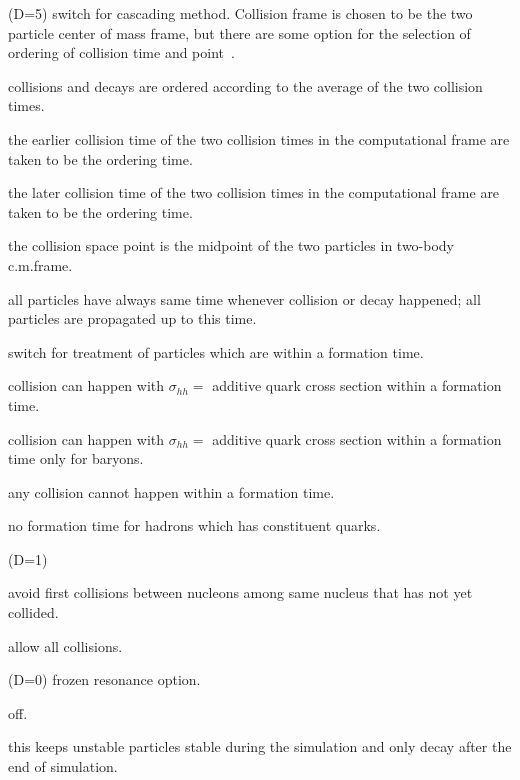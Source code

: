 \documentclass[]{article}
\newenvironment{entry}%
{\begin{list}{}{\setlength{\topsep}{0mm} \setlength{\itemsep}{0mm}
\setlength{\parskip}{0mm} \setlength{\parsep}{0mm}
\setlength{\leftmargin}{20mm} \setlength{\rightmargin}{0mm}
\setlength{\labelwidth}{18mm} \setlength{\labelsep}{2mm}}}%
{\end{list}}
\newenvironment{subentry}%
{\begin{list}{}{\setlength{\topsep}{0mm} \setlength{\itemsep}{0mm}
\setlength{\parskip}{0mm} \setlength{\parsep}{0mm}
\setlength{\leftmargin}{10mm} \setlength{\rightmargin}{0mm}
\setlength{\labelwidth}{18mm} \setlength{\labelsep}{2mm}}}%
{\end{list}}
\newcommand{\itemt}[1]{\item[{\tt #1}\hfill]}
\begin{document}
\begin{entry}
\itemt{mstc(52) :} (D=5) switch for cascading method. %
    Collision frame is chosen to be the two particle center of mass frame,
    but there are some option for the selection of ordering
    of collision time and point~\cite{zpc,bin1}.
 \begin{subentry}
    \itemt{$=2$:} collisions and decays are ordered according to the
                  average of the two collision times.
    \itemt{$=3$:} the earlier collision time of the two collision times
                  in the computational frame are taken to be the ordering time.
    \itemt{$=4$:} the later collision time of the two collision times
                  in the computational frame are taken to be the ordering time.
    \itemt{$=5$:} the collision space point is the midpoint of
                  the two particles in two-body c.m.frame.
    \itemt{$=11$:} all particles have always same time whenever collision
                   or decay happened; all particles are propagated up
                   to this time.
  \end{subentry}

\itemt{mstc(53)(D=1) :} switch for treatment of particles which are within a
                         formation time.
 \begin{subentry}
   \itemt{$=1$:} collision can happen with $\sigma_{hh}=$ additive quark
                 cross section within a formation time.
   \itemt{$=2$:} collision can happen with $\sigma_{hh}=$ additive quark
                 cross section within a formation time only for baryons.
    \itemt{$=3$:}any collision cannot happen within a formation time.
    \itemt{$=4$:}no formation time for hadrons which has constituent quarks.
 \end{subentry}

\itemt{mstc(54) :} (D=1)
  \begin{subentry}
    \itemt{$=1$ :} avoid first collisions between nucleons among same nucleus
                   that has not yet collided.
   \itemt{$=0$ :}  allow all collisions.
  \end{subentry}

\itemt{mstc(55) :} (D=0) frozen resonance option.
  \begin{subentry}
   \itemt{$=0$ :} off.
    \itemt{$=1$ :} this keeps unstable particles stable
                   during the simulation and only decay
                   after the end of simulation.
  \end{subentry}


\end{entry}
\end{document}
